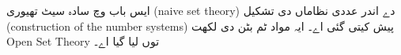 \documentclass[../../../include/open-logic-section]{subfiles}
\begin{document}

\begin{editorial}
ایس باب وچ سادہ سیٹ تھیوری (naive set theory) دے اندر عددی نظاماں دی
تشکیل (construction of the number systems) پیش کیتی گئی اے۔
ایہ مواد ٹم بٹن دی لکھت Open Set Theory توں لیا گیا اے۔
\end{editorial}


\OLEndChapterHook
\end{document}
